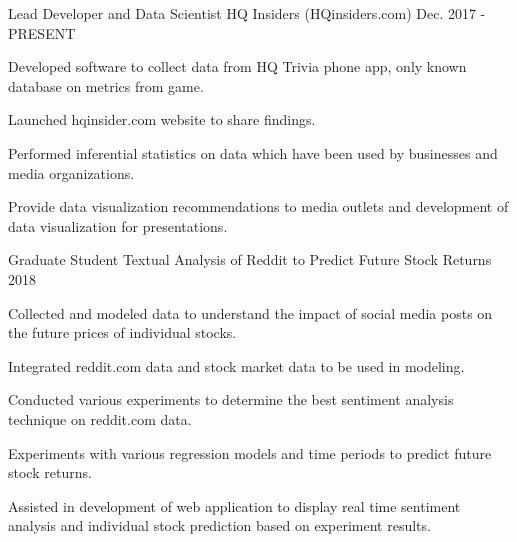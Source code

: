 

\begin{cventries}

  \cventry
    {Lead Developer and Data Scientist} %
    {HQ Insiders (HQinsiders.com)} %
    {} %
    {Dec. 2017 - PRESENT} %
    {
      \begin{cvitems} %
        \item {Developed software to collect data from HQ Trivia phone app, only known database on metrics from game.}
        \item {Launched hqinsider.com website to share findings.}        
        \item {Performed inferential statistics on data which have been used by businesses and media organizations.}
        \item {Provide data visualization recommendations to media outlets and development of data visualization for presentations. }        
      \end{cvitems}
    }

  \cventry
    {Graduate Student} %
    {Textual Analysis of Reddit to Predict Future Stock Returns} %
    {} %
    {2018} %
    {
      \begin{cvitems} %
        \item {Collected and modeled data to understand the impact of social media posts on the future prices of individual stocks.}
        \item {Integrated reddit.com data and stock market data to be used in modeling.}
        \item {Conducted various experiments to determine the best sentiment analysis technique on reddit.com data.}
        \item {Experiments with various regression models and time periods to predict future stock returns.}
        \item {Assisted in development of web application to display real time sentiment analysis and individual stock prediction based on experiment results.}
      \end{cvitems}
    }

\end{cventries}
